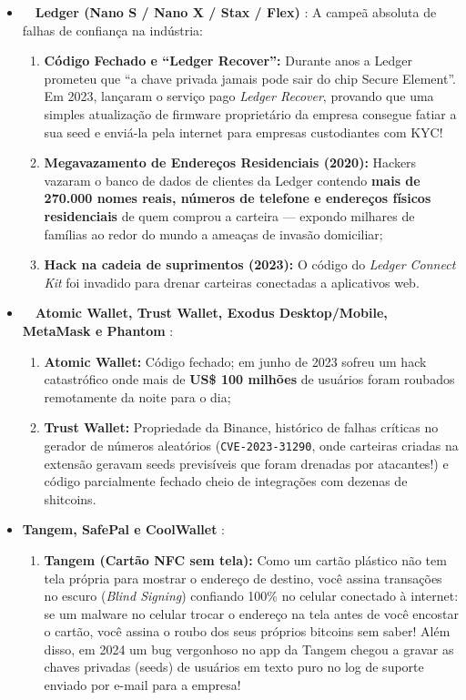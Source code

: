 \documentclass{pousadaguide}
\begin{document}
\begin{perigo}
\begin{itemize}
  \item {}\ \ \textbf{Ledger (Nano S / Nano X / Stax / Flex)} : A campeã absoluta de falhas de confiança na indústria:
  \begin{enumerate}
    \item \textbf{Código Fechado e “Ledger Recover”:} Durante anos a Ledger prometeu que ``a chave privada jamais pode sair do chip Secure Element''. Em 2023, lançaram o serviço pago \emph{Ledger Recover}, provando que uma simples atualização de firmware proprietário da empresa consegue fatiar a sua seed e enviá-la pela internet para empresas custodiantes com KYC!
    \item \textbf{Megavazamento de Endereços Residenciais (2020):} Hackers vazaram o banco de dados de clientes da Ledger contendo \textbf{mais de 270.000 nomes reais, números de telefone e endereços físicos residenciais} de quem comprou a carteira — expondo milhares de famílias ao redor do mundo a ameaças de invasão domiciliar;
    \item \textbf{Hack na cadeia de suprimentos (2023):} O código do \emph{Ledger Connect Kit} foi invadido para drenar carteiras conectadas a aplicativos web.
  \end{enumerate}
  \item {}\ \ \textbf{Atomic Wallet, Trust Wallet, Exodus Desktop/Mobile, MetaMask e Phantom} :
  \begin{enumerate}
    \item \textbf{Atomic Wallet:} Código fechado; em junho de 2023 sofreu um hack catastrófico onde mais de \textbf{US\$ 100 milhões} de usuários foram roubados remotamente da noite para o dia;
    \item \textbf{Trust Wallet:} Propriedade da Binance, histórico de falhas críticas no gerador de números aleatórios (\texttt{CVE-2023-31290}, onde carteiras criadas na extensão geravam seeds previsíveis que foram drenadas por atacantes!) e código parcialmente fechado cheio de integrações com dezenas de shitcoins.
  \end{enumerate}
  \item \textbf{Tangem, SafePal e CoolWallet} :
  \begin{enumerate}
    \item \textbf{Tangem (Cartão NFC sem tela):} Como um cartão plástico não tem tela própria para mostrar o endereço de destino, você assina transações no escuro (\emph{Blind Signing}) confiando 100\% no celular conectado à internet: se um malware no celular trocar o endereço na tela antes de você encostar o cartão, você assina o roubo dos seus próprios bitcoins sem saber! Além disso, em 2024 um bug vergonhoso no app da Tangem chegou a gravar as chaves privadas (seeds) de usuários em texto puro no log de suporte enviado por e-mail para a empresa!

\end{enumerate}
\end{itemize}
\end{perigo}
\end{document}
